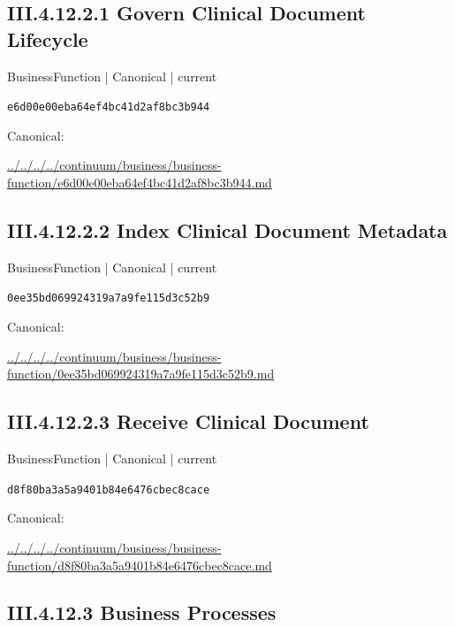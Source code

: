 \documentclass[10pt,a4paper]{article}
\begin{document}
\subsection*{III.4.12.2.1 Govern Clinical Document Lifecycle}
{\small BusinessFunction | Canonical | current}\par
\texttt{e6d00e00eba64ef4bc41d2af8bc3b944}\par
Canonical: \par
{\footnotesize\url{../../../../continuum/business/business-function/e6d00e00eba64ef4bc41d2af8bc3b944.md}}\par
\subsection*{III.4.12.2.2 Index Clinical Document Metadata}
{\small BusinessFunction | Canonical | current}\par
\texttt{0ee35bd069924319a7a9fe115d3c52b9}\par
Canonical: \par
{\footnotesize\url{../../../../continuum/business/business-function/0ee35bd069924319a7a9fe115d3c52b9.md}}\par
\subsection*{III.4.12.2.3 Receive Clinical Document}
{\small BusinessFunction | Canonical | current}\par
\texttt{d8f80ba3a5a9401b84e6476cbec8cace}\par
Canonical: \par
{\footnotesize\url{../../../../continuum/business/business-function/d8f80ba3a5a9401b84e6476cbec8cace.md}}\par
\subsection*{III.4.12.3 Business Processes}
\end{document}
